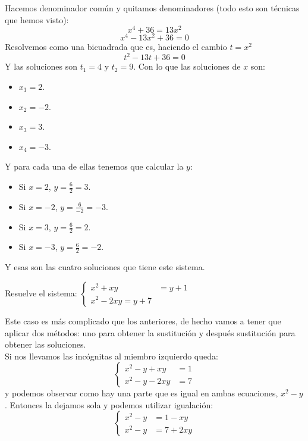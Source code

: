 \documentclass[a4paper,11pt,answers]{exam}
\begin{document}
\begin{questions}
\begin{solution}
      Hacemos denominador común y quitamos denominadores (todo esto son técnicas que hemos visto):
      \[x^4 + 36 = 13x^2\]
      \[x^4 - 13x^2 + 36 = 0\]
      Resolvemos como una bicuadrada que es, haciendo el cambio $t=x^2$
      \[t^2 - 13t + 36 = 0\]
      Y las soluciones son $t_1 = 4$ y $t_2 = 9$.
      Con lo que las soluciones de $x$ son:
      \begin{itemize}
      \item $x_1 = 2$.
      \item $x_2 = -2$.
      \item $x_3 = 3$.
      \item $x_4 = -3$.
      \end{itemize}
      Y para cada una de ellas tenemos que calcular la $y$:
      \begin{itemize}
      \item Si $x = 2$, $y = \frac{6}{2} = 3$.
      \item Si $x = -2$, $y = \frac{6}{-2} = -3$.
      \item Si $x = 3$, $y = \frac{6}{2} = 2$.
      \item Si $x = -3$, $y = \frac{6}{2} = -2$.
      \end{itemize}
      Y esas son las cuatro soluciones que tiene este sistema.
    \end{solution}
  \question Resuelve el sistema: $
    \begin{cases}
      x^2+xy &= y +1\\
      x^2 - 2xy = y + 7
    \end{cases}$
    \begin{solution}
      Este caso es más complicado que los anteriores, de hecho vamos a tener que aplicar dos
      métodos: uno para obtener la sustitución y después sustitución para obtener las soluciones.\\
      Si nos llevamos las incógnitas al miembro izquierdo queda:
      \[
        \begin{cases}
          x^2 -y + xy &=1\\
          x^2 -y - 2xy &= 7
        \end{cases}
      \]
      y podemos observar como hay una parte que es igual en ambas ecuaciones, $x^2 - y$. Entonces
      la dejamos sola y podemos utilizar igualación:
      \[
        \begin{cases}
          x^2 -y &=1 - xy\\
          x^2 -y &= 7 +2xy
        \end{cases}
      \]

\end{solution}
\end{questions}
\end{document}
